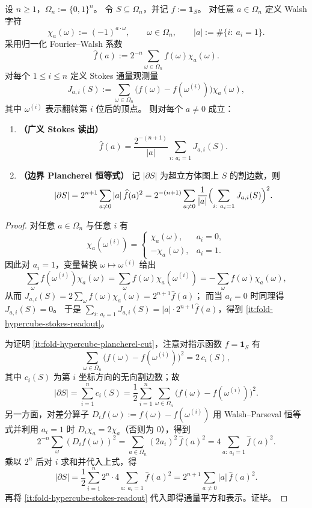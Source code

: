 
\begin{theorem}\label{thm:fold-hypercube-stokes-plancherel-boundary-energy}
设 \(n\ge 1\)，\(\Omega_n:=\{0,1\}^n\)。
令 \(S\subseteq\Omega_n\)，并记 \(f:=\mathbf 1_S\)。
对任意 \(a\in\Omega_n\) 定义 Walsh 字符
\[
\chi_a(\omega):=(-1)^{a\cdot \omega},
\qquad \omega\in\Omega_n,
\qquad |a|:=\#\{i:\ a_i=1\}.
\]
采用归一化 Fourier--Walsh 系数
\[
\widehat f(a):=2^{-n}\sum_{\omega\in\Omega_n} f(\omega)\chi_a(\omega).
\]
对每个 \(1\le i\le n\) 定义 Stokes 通量观测量
\[
J_{a,i}(S):=\sum_{\omega\in\Omega_n}\bigl(f(\omega)-f(\omega^{(i)})\bigr)\chi_a(\omega),
\]
其中 \(\omega^{(i)}\) 表示翻转第 \(i\) 位后的顶点。
则对每个 \(a\neq 0\) 成立：
\begin{enumerate}
  \item \label{it:fold-hypercube-stokes-readout} \textbf{（广义 Stokes 读出）}
  \[
  \widehat f(a)=\frac{2^{-(n+1)}}{|a|}\sum_{i:\ a_i=1}J_{a,i}(S).
  \]
  \item \label{it:fold-hypercube-plancherel-cut} \textbf{（边界 Plancherel 恒等式）}
  记 \(|\partial S|\) 为超立方体图上 \(S\) 的割边数，则
  \[
  |\partial S|
  =
  2^{n+1}\sum_{a\neq 0}|a|\,\widehat f(a)^2
  =
  2^{-(n+1)}\sum_{a\neq 0}\frac{1}{|a|}
  \Bigl(\sum_{i:\ a_i=1}J_{a,i}(S)\Bigr)^2.
  \]
\end{enumerate}
\end{theorem}
\begin{proof}
对任意 \(a\in\Omega_n\) 与任意 \(i\) 有
\[
\chi_a(\omega^{(i)})=
\begin{cases}
\chi_a(\omega),& a_i=0,\\
-\chi_a(\omega),& a_i=1.
\end{cases}
\]
因此对 \(a_i=1\)，变量替换 \(\omega\mapsto\omega^{(i)}\) 给出
\[
\sum_{\omega} f(\omega^{(i)})\chi_a(\omega)
=\sum_{\omega}f(\omega)\chi_a(\omega^{(i)})
=-\sum_{\omega}f(\omega)\chi_a(\omega),
\]
从而
\(
J_{a,i}(S)=2\sum_{\omega}f(\omega)\chi_a(\omega)=2^{n+1}\widehat f(a)
\)；
而当 \(a_i=0\) 时同理得 \(J_{a,i}(S)=0\)。
于是
\(
\sum_{i:\ a_i=1}J_{a,i}(S)=|a|\cdot 2^{n+1}\widehat f(a)
\)，得到 \eqref{it:fold-hypercube-stokes-readout}。
\par
为证明 \eqref{it:fold-hypercube-plancherel-cut}，注意对指示函数 \(f=\mathbf 1_S\) 有
\[
\sum_{\omega\in\Omega_n}\bigl(f(\omega)-f(\omega^{(i)})\bigr)^2=2\,c_i(S),
\]
其中 \(c_i(S)\) 为第 \(i\) 坐标方向的无向割边数；故
\[
|\partial S|=\sum_{i=1}^n c_i(S)=\frac12\sum_{i=1}^n\sum_{\omega\in\Omega_n}\bigl(f(\omega)-f(\omega^{(i)})\bigr)^2.
\]
另一方面，对差分算子 \(D_i f(\omega):=f(\omega)-f(\omega^{(i)})\) 用 Walsh--Parseval 恒等式并利用 \(a_i=1\) 时 \(D_i\chi_a=2\chi_a\)（否则为 \(0\)），得到
\[
2^{-n}\sum_{\omega}(D_i f(\omega))^2
=
\sum_{a\in\Omega_n} (2a_i)^2\,\widehat f(a)^2
=4\sum_{a:\ a_i=1}\widehat f(a)^2.
\]
乘以 \(2^n\) 后对 \(i\) 求和并代入上式，得
\[
|\partial S|
=\frac12\sum_{i=1}^n 2^n\cdot 4\sum_{a:\ a_i=1}\widehat f(a)^2
=2^{n+1}\sum_{a\neq 0}|a|\,\widehat f(a)^2.
\]
再将 \eqref{it:fold-hypercube-stokes-readout} 代入即得通量平方和表示。证毕。
\end{proof}

